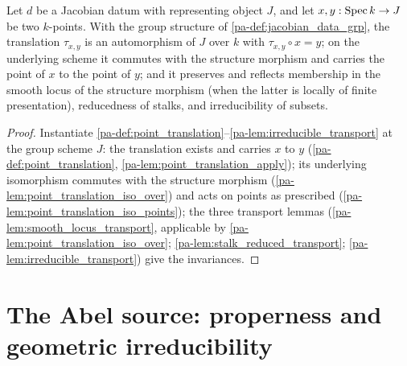 \begin{corollary}
  \label{pa-cor:jacobian_translation}
  \leanok

  Let \(d\) be a Jacobian datum with representing object \(J\), and let
  \(x, y : \operatorname{Spec} k \to J\) be two \(k\)-points. With the group structure of
  \ref{pa-def:jacobian_data_grp}, the translation \(\tau_{x,y}\) is an
  automorphism of \(J\) over \(k\) with \(\tau_{x,y} \circ x = y\); on the
  underlying scheme it commutes with the structure morphism and carries the
  point of \(x\) to the point of \(y\); and it preserves and reflects
  membership in the smooth locus of the structure morphism (when the latter is
  locally of finite presentation), reducedness of stalks, and irreducibility
  of subsets.
\end{corollary}
\begin{proof}
  \leanok
  Instantiate \ref{pa-def:point_translation}--\ref{pa-lem:irreducible_transport} at
  the group scheme \(J\): the translation exists and carries \(x\) to \(y\)
  (\ref{pa-def:point_translation}, \ref{pa-lem:point_translation_apply}); its
  underlying isomorphism commutes with the structure morphism
  (\ref{pa-lem:point_translation_iso_over}) and acts on points as prescribed
  (\ref{pa-lem:point_translation_iso_points}); the three transport lemmas
  (\ref{pa-lem:smooth_locus_transport}, applicable by
  \ref{pa-lem:point_translation_iso_over}; \ref{pa-lem:stalk_reduced_transport};
  \ref{pa-lem:irreducible_transport}) give the invariances.
\end{proof}

\section{The Abel source: properness and geometric irreducibility}
\label{pa-sec:abel_source}

